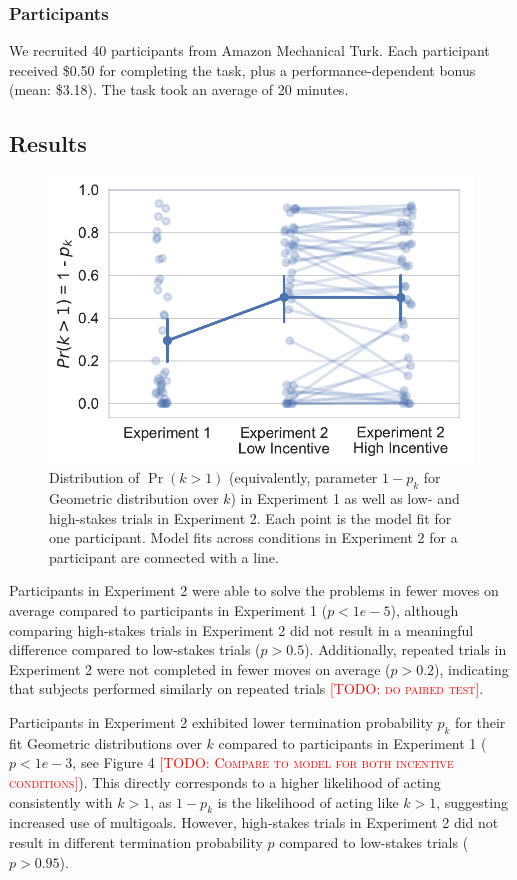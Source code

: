 \documentclass[10pt,letterpaper]{article}
\newcommand{\todo}[1]{\textcolor{red}{\textsc{[TODO: #1]}}}
\begin{document}
\subsubsection{Participants}
We recruited 40 participants from Amazon Mechanical Turk. Each participant received \$0.50 for completing the task, plus a performance-dependent bonus (mean: \$3.18). The task took an average of 20 minutes.

\subsection{Results}

\begin{figure}[ht]
    \centering
    \includegraphics[scale=0.55]{geom-k-p}
    \caption{Distribution of $\Pr(k > 1)$ (equivalently, parameter $1-p_k$ for Geometric distribution over $k$) in Experiment 1 as well as low- and high-stakes trials in Experiment 2. Each point is the model fit for one participant. Model fits across conditions in Experiment 2 for a participant are connected with a line.}
\end{figure}

Participants in Experiment 2 were able to solve the problems in fewer moves on average compared to participants in Experiment 1 ($p < 1e-5$), although comparing high-stakes trials in Experiment 2 did not result in a meaningful difference compared to low-stakes trials ($p > 0.5$). Additionally, repeated trials in Experiment 2 were not completed in fewer moves on average ($p > 0.2$), indicating that subjects performed similarly on repeated trials \todo{do paired test}.

Participants in Experiment 2 exhibited lower termination probability $p_k$ for their fit Geometric distributions over $k$ compared to participants in Experiment 1 ($p < 1e-3$, see Figure 4 \todo{Compare to model for both incentive conditions}). This directly corresponds to a higher likelihood of acting consistently with $k > 1$, as $1-p_k$ is the likelihood of acting like $k > 1$, suggesting increased use of multigoals. However, high-stakes trials in Experiment 2 did not result in different termination probability $p$ compared to low-stakes trials ($p > 0.95$).
\end{document}
